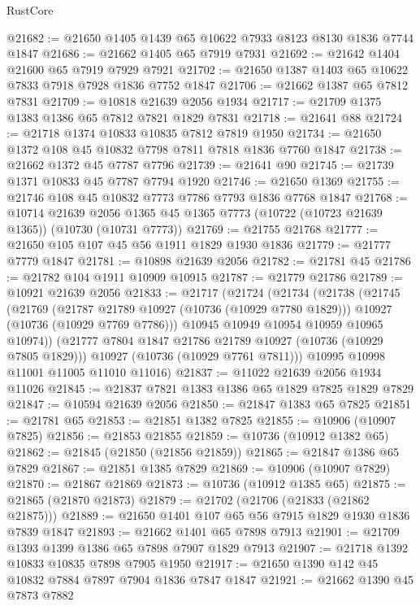 \begin{lexlean}{RustCore}
\begin{coremodule}
@21682 := @21650 @1405 @1439 @65 @10622 @7933 @8123 @8130 @1836 @7744 @1847
@21686 := @21662 @1405 @65 @7919 @7931
@21692 := @21642 @1404 @21600 @65 @7919 @7929 @7921
@21702 := @21650 @1387 @1403 @65 @10622 @7833 @7918 @7928 @1836 @7752 @1847
@21706 := @21662 @1387 @65 @7812 @7831
@21709 := @10818 @21639 @2056 @1934
@21717 := @21709 @1375 @1383 @1386 @65 @7812 @7821 @1829 @7831
@21718 := @21641 @88
@21724 := @21718 @1374 @10833 @10835 @7812 @7819 @1950
@21734 := @21650 @1372 @108 @45 @10832 @7798 @7811 @7818 @1836 @7760 @1847
@21738 := @21662 @1372 @45 @7787 @7796
@21739 := @21641 @90
@21745 := @21739 @1371 @10833 @45 @7787 @7794 @1920
@21746 := @21650 @1369
@21755 := @21746 @108 @45 @10832 @7773 @7786 @7793 @1836 @7768 @1847
@21768 := @10714
    @21639
    @2056
    @1365
    @45
    @1365
    @7773
    (@10722 (@10723 @21639 @1365))
    (@10730 (@10731 @7773))
@21769 := @21755 @21768
@21777 := @21650 @105 @107 @45 @56 @1911 @1829 @1930 @1836
@21779 := @21777 @7779 @1847
@21781 := @10898 @21639 @2056
@21782 := @21781 @45
@21786 := @21782 @104 @1911 @10909 @10915
@21787 := @21779 @21786
@21789 := @10921 @21639 @2056
@21833 := @21717
    (@21724
      (@21734
        (@21738
          (@21745
            (@21769
              (@21787 @21789 @10927 (@10736 (@10929 @7780 @1829)))
              @10927
              (@10736 (@10929 @7769 @7786)))
            @10945
            @10949
            @10954
            @10959
            @10965
            @10974))
        (@21777 @7804 @1847 @21786 @21789 @10927 (@10736 (@10929 @7805 @1829)))
        @10927
        (@10736 (@10929 @7761 @7811)))
      @10995
      @10998
      @11001
      @11005
      @11010
      @11016)
@21837 := @11022 @21639 @2056 @1934 @11026
@21845 := @21837 @7821 @1383 @1386 @65 @1829 @7825 @1829 @7829
@21847 := @10594 @21639 @2056
@21850 := @21847 @1383 @65 @7825
@21851 := @21781 @65
@21853 := @21851 @1382 @7825
@21855 := @10906 (@10907 @7825)
@21856 := @21853 @21855
@21859 := @10736 (@10912 @1382 @65)
@21862 := @21845 (@21850 (@21856 @21859))
@21865 := @21847 @1386 @65 @7829
@21867 := @21851 @1385 @7829
@21869 := @10906 (@10907 @7829)
@21870 := @21867 @21869
@21873 := @10736 (@10912 @1385 @65)
@21875 := @21865 (@21870 @21873)
@21879 := @21702 (@21706 (@21833 (@21862 @21875)))
@21889 := @21650 @1401 @107 @65 @56 @7915 @1829 @1930 @1836 @7839 @1847
@21893 := @21662 @1401 @65 @7898 @7913
@21901 := @21709 @1393 @1399 @1386 @65 @7898 @7907 @1829 @7913
@21907 := @21718 @1392 @10833 @10835 @7898 @7905 @1950
@21917 := @21650 @1390 @142 @45 @10832 @7884 @7897 @7904 @1836 @7847 @1847
@21921 := @21662 @1390 @45 @7873 @7882

\end{coremodule}
\end{lexlean}
